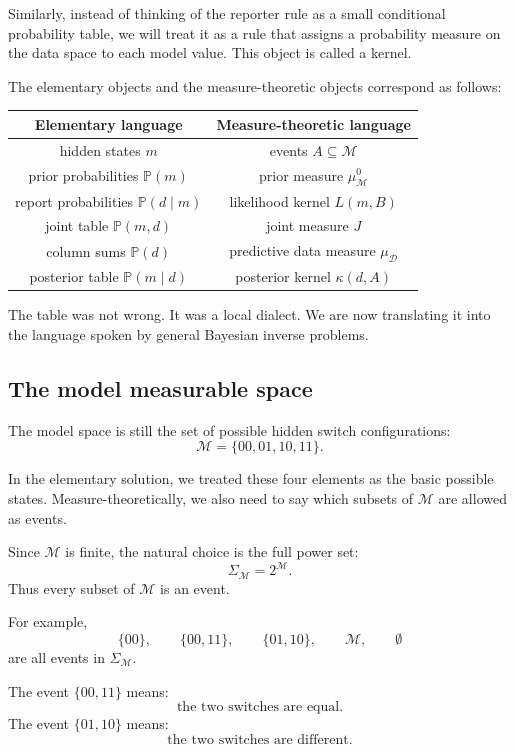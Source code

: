 \documentclass[11pt]{article}
\newcommand{\M}{\mathcal{M}}
\newcommand{\D}{\mathcal{D}}
\newcommand{\SigmaM}{\Sigma_{\M}}
\newcommand{\muMzero}{\mu^0_{\M}}
\newcommand{\muD}{\mu_{\D}}
\begin{document}
Similarly, instead of thinking of the reporter rule as a small conditional probability table, we will treat it as a rule that assigns a probability measure on the data space to each model value. This object is called a kernel.

The elementary objects and the measure-theoretic objects correspond as follows:

\begin{center}
\begin{tabular}{c c}
\toprule
Elementary language & Measure-theoretic language \\
\midrule
hidden states \(m\) & events \(A\subseteq \M\) \\
prior probabilities \(\mathbb{P}(m)\) & prior measure \(\muMzero\) \\
report probabilities \(\mathbb{P}(d\mid m)\) & likelihood kernel \(L(m,B)\) \\
joint table \(\mathbb{P}(m,d)\) & joint measure \(J\) \\
column sums \(\mathbb{P}(d)\) & predictive data measure \(\muD\) \\
posterior table \(\mathbb{P}(m\mid d)\) & posterior kernel \(\kappa(d,A)\) \\
\bottomrule
\end{tabular}
\end{center}

The table was not wrong. It was a local dialect. We are now translating it into the language spoken by general Bayesian inverse problems.

\subsection{The model measurable space}

The model space is still the set of possible hidden switch configurations:
\[
    \M=\{00,01,10,11\}.
\]

In the elementary solution, we treated these four elements as the basic possible states. Measure-theoretically, we also need to say which subsets of \(\M\) are allowed as events.

Since \(\M\) is finite, the natural choice is the full power set:
\[
    \SigmaM = 2^{\M}.
\]
Thus every subset of \(\M\) is an event.

For example,
\[
    \{00\},
    \qquad
    \{00,11\},
    \qquad
    \{01,10\},
    \qquad
    \M,
    \qquad
    \emptyset
\]
are all events in \(\SigmaM\).

The event \(\{00,11\}\) means:
\[
    \text{the two switches are equal}.
\]
The event \(\{01,10\}\) means:
\[
    \text{the two switches are different}.
\]
\end{document}
